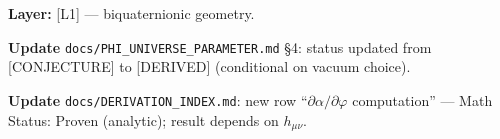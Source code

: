 \noindent\textbf{Layer:} [L1] — biquaternionic geometry.

\noindent\textbf{Update} \texttt{docs/PHI\_UNIVERSE\_PARAMETER.md} §4: status updated from
[CONJECTURE] to [DERIVED] (conditional on vacuum choice).

\noindent\textbf{Update} \texttt{docs/DERIVATION\_INDEX.md}: new row ``$\partial\alpha/\partial\varphi$
computation'' — Math Status: Proven (analytic); result depends on $h_{\mu\nu}$.
